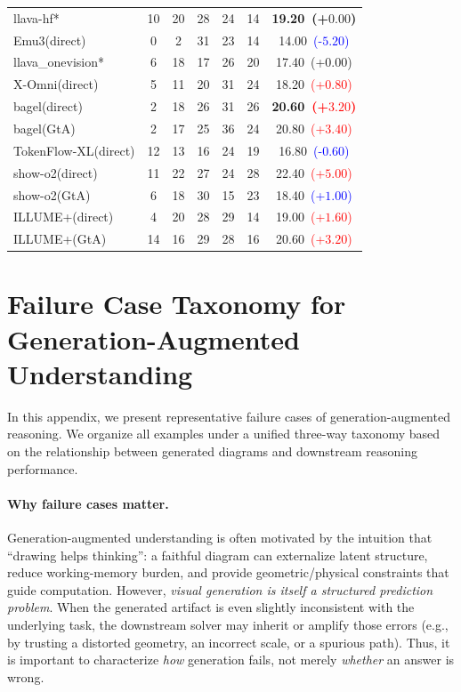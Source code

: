 \documentclass{article}
\providecommand{\rowcolor}[1]{}
\theoremstyle{plain}
\theoremstyle{definition}
\theoremstyle{remark}
\begin{document}
\begin{table}[!htbp]
{\begin{tabular}{@{}lcccccc@{}}
\midrule

\rowcolor{gray!12}
llava-hf* & 10 & 20 & 28 & 24 & 14 & \textbf{19.20~(+$0.00$)} \\
Emu3(direct) & 0 & 2 & 31 & 23 & 14 & 14.00~\textcolor{blue}{(-$5.20$)} \\

\midrule

\rowcolor{gray!12}
llava\_onevision* & 6 & 18 & 17 & 26 & 20 & 17.40~(+$0.00$) \\
X-Omni(direct) & 5 & 11 & 20 & 31 & 24 & 18.20~\textcolor{red}{(+$0.80$)} \\
bagel(direct) & 2 & 18 & 26 & 31 & 26 & \textbf{20.60~\textcolor{red}{(+$3.20$)}} \\
bagel(GtA) & 2 & 17 & 25 & 36 & 24 & 20.80~\textcolor{red}{(+$3.40$)} \\
TokenFlow-XL(direct) & 12 & 13 & 16 & 24 & 19 & 16.80~\textcolor{blue}{(-$0.60$)} \\
show-o2(direct) & 11 & 22 & 27 & 24 & 28 & 22.40~\textcolor{red}{(+$5.00$)} \\
show-o2(GtA) & 6 & 18 & 30 & 15 & 23 & 18.40~\textcolor{blue}{(+$1.00$)} \\
ILLUME+(direct) & 4 & 20 & 28 & 29 & 14 & 19.00~\textcolor{red}{(+$1.60$)} \\
ILLUME+(GtA) & 14 & 16 & 29 & 28 & 16 & 20.60~\textcolor{red}{(+$3.20$)} \\

\bottomrule
\end{tabular}%
}
\end{table}

\section{Failure Case Taxonomy for Generation-Augmented Understanding}
\label{sec:appendix_failure_cases}

In this appendix, we present representative failure cases of generation-augmented reasoning.
We organize all examples under a unified three-way taxonomy based on the relationship
between generated diagrams and downstream reasoning performance.

\paragraph{Why failure cases matter.}
Generation-augmented understanding is often motivated by the intuition that ``drawing helps thinking'':
a faithful diagram can externalize latent structure, reduce working-memory burden, and provide
geometric/physical constraints that guide computation.
However, \emph{visual generation is itself a structured prediction problem}.
When the generated artifact is even slightly inconsistent with the underlying task, the downstream solver
may inherit or amplify those errors (e.g., by trusting a distorted geometry, an incorrect scale, or a spurious path).
Thus, it is important to characterize \emph{how} generation fails, not merely \emph{whether} an answer is wrong.
\end{document}

